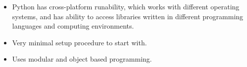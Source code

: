 \documentclass[landscape,a0paper,fontscale=0.22]{baposter} %
\newcommand{\compresslist}{ %
\setlength{\itemsep}{1pt}
\setlength{\parskip}{0pt}
\setlength{\parsep}{0pt}
}
\begin{document}
\begin{poster}
{\begin{itemize}
\item  Python has cross-platform runability, which works with different operating systems, and has ability to access libraries written in different programming languages and computing environments. 


\item  Very minimal setup procedure to start with. 

\item  Uses modular and object based programming.
\end{itemize}





}




%
%


\end{poster}
\end{document}
